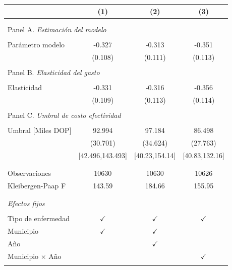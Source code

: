 \begin{tabular}{l c  c c}
\toprule[1.5pt]
\multicolumn{1}{c}{\textbf{}} & \textbf{(1)} & \textbf{(2)} & \textbf{(3)}  \\ \hline \\
\\
\multicolumn{4}{l}{Panel A. \textit{Estimación del modelo}}\\
\\
Parámetro modelo & -0.327  & -0.313 & -0.351  \\
& (0.108)  & (0.111) & (0.113)  \\
\\
\multicolumn{4}{l}{Panel B. \textit{Elasticidad del gasto}}\\
\\
Elasticidad & -0.331 & -0.316 & -0.356  \\
& (0.109)  & (0.113) & (0.114)  \\
\\
\multicolumn{4}{l}{Panel C. \textit{Umbral de costo efectividad}}\\
\\
Umbral [Miles DOP] & 92.994  & 97.184 & 86.498  \\
& (30.701) & (34.624) & (27.763)  \\
& [42.496,143.493]  & [40.23,154.14]  & [40.83,132.16]   \\
\\
\midrule[1 pt]
\\
Observaciones & 10630 &  10630 & 10626 \\
Kleibergen-Paap F & 143.59 & 184.66 & 155.95 \\
\\
\midrule[1 pt]
\\
\multicolumn{4}{l}{\textit{Efectos fijos}} \\
\\
Tipo de enfermedad & $\checkmark$ & $\checkmark$ & $\checkmark$ \\
Municipio & $\checkmark$   & $\checkmark$ & \\
Año &   & $\checkmark$ &  \\
Municipio $\times$ Año &    &  & $\checkmark$ \\
\\
\midrule[1 pt]
\end{tabular}

